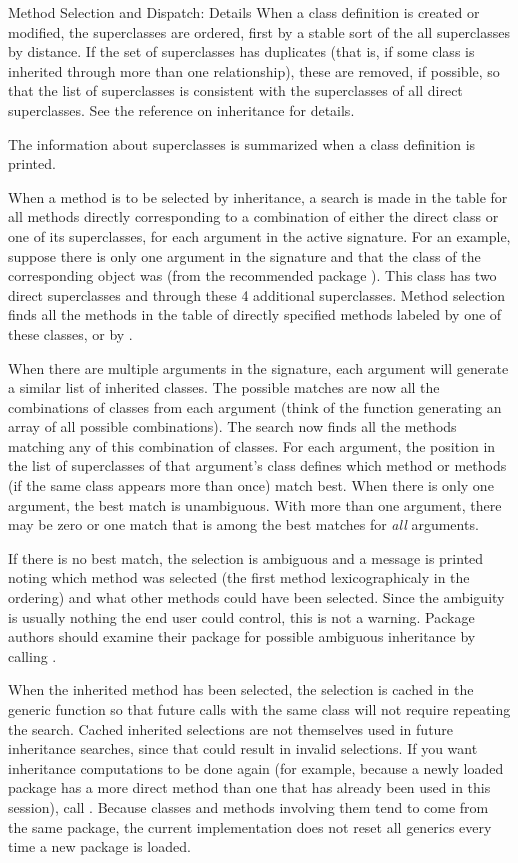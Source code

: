 \begin{Section}{Method Selection and Dispatch: Details}
When a class definition is created or modified, the superclasses
are ordered, first by a stable sort of the all superclasses by
distance.
If the set of superclasses has duplicates (that is, if some class is
inherited through more than one relationship), these are removed, if
possible, so that the list of superclasses is consistent with the
superclasses of all direct superclasses.
See the reference on inheritance for details.

The information about superclasses is summarized when a class
definition is printed.

When a method is to be selected by inheritance, a search is made in
the table for all methods directly corresponding to a combination of
either the direct class or one of its superclasses, for each argument
in the active signature.
For an example, suppose there is only one argument in the signature and that the class of
the corresponding object was  (from the recommended package
).
This class has two direct superclasses and through these 4 additional superclasses.
Method selection finds all the methods in the table of directly
specified methods labeled by one of these classes, or by
.

When there are multiple arguments in the signature, each argument will
generate a similar  list of inherited classes.
The possible matches are now all the combinations of classes from each
argument (think of the function  generating an array of
all possible combinations).
The search now finds all the methods matching any of this combination
of classes.
For each argument, the position in the list of superclasses of that
argument's class defines which method or methods (if the same class
appears more than once) match best.
When there is only one argument, the best match is unambiguous.
With more than one argument, there may be zero or one match that is
among the best matches for \emph{all} arguments.

If there is no best match, the selection is ambiguous and a message is
printed noting which method was selected (the first method
lexicographicaly in the ordering) and what other methods could have
been selected.
Since the ambiguity is usually nothing the end user could control,
this is not a warning.
Package authors should examine their package for possible ambiguous
inheritance by calling .

When the inherited method has been selected, the selection is cached
in the generic function so that future calls with the same class will
not require repeating the search.  Cached inherited selections are
not themselves used in future inheritance searches, since that could result
in invalid selections.
If you want inheritance computations to be done again (for example,
because a newly loaded package has a more direct method than one
that has already been used in this session), call
.  Because classes and methods involving
them tend to come from the same package, the current implementation
does not reset all generics every time a new package is loaded.


\end{Section}
